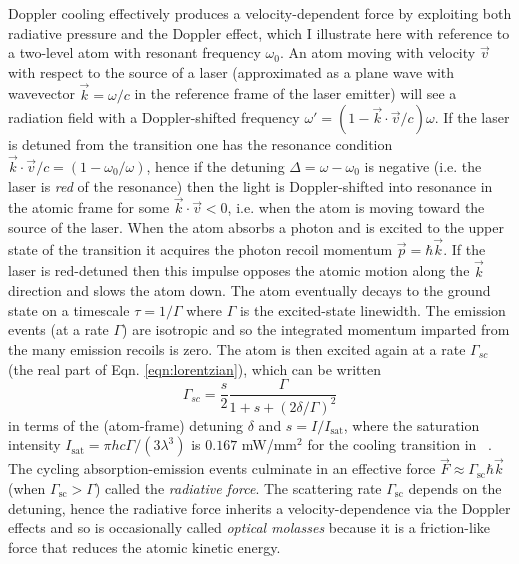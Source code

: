 	Doppler cooling effectively produces a velocity-dependent force by exploiting both radiative pressure and the Doppler effect, which I illustrate here with reference to a two-level atom with resonant frequency $\omega_0$.
	An atom moving with velocity $\vec{v}$ with respect to the source of a laser (approximated as a plane wave with wavevector $\vec{k} = \omega/c$ in the reference frame of the laser emitter) will see a radiation field with a Doppler-shifted frequency $\omega' = (1 - \vec{k}\cdot \vec{v}/c)\omega$.
	If the laser is detuned from the transition one has the resonance condition $\vec{k} \cdot \vec{v}/c = (1 - \omega_0/\omega)$, hence if the detuning $\Delta = \omega-\omega_0$ is negative (i.e. the laser is \emph{red} of the resonance) then the light is Doppler-shifted into resonance in the atomic frame for some $\vec{k} \cdot \vec{v}<0$, i.e. when the atom is moving toward the source of the laser. 
	When the atom absorbs a photon and is excited to the upper state of the transition it acquires the photon recoil momentum $\vec{p} = \hbar \vec{k}$.
	If the laser is red-detuned then this impulse opposes the atomic motion along the $\vec{k}$ direction and slows the atom down.
	The atom eventually decays to the ground state on a timescale $\tau = 1/\Gamma$ where $\Gamma$ is the excited-state linewidth.
	The emission events (at a rate $\Gamma$) are isotropic and so the integrated momentum imparted from the many emission recoils is zero.
	The atom is then excited again at a rate $\Gamma_{sc}$ (the real part of Eqn. \ref{eqn:lorentzian}), which can be written 
	\begin{equation}
		\Gamma_{sc} = \frac{s}{2 }\frac{\Gamma}{1 + s + (2\delta/\Gamma)^2}
	\end{equation}	
	in terms of the (atom-frame) detuning $\delta$ and $s=I/I_\textrm{sat}$, where the saturation intensity $I_\textrm{sat} = \pi h c \Gamma/(3\lambda^3)$ is $0.167$ mW/mm$^2$ for the cooling transition in \mhe~\cite{BaldwinReview}.
	The cycling absorption-emission events culminate in an effective force $\vec{F} \approx \Gamma_\textrm{sc}\hbar\vec{k}$ (when $\Gamma_\textrm{sc}>\Gamma$) called the \emph{radiative force}. 
	The scattering rate $\Gamma_\textrm{sc}$ depends on the detuning, hence the radiative force inherits a velocity-dependence via the Doppler effects and so is occasionally called \emph{optical molasses} because it is a friction-like force that reduces the atomic kinetic energy.

